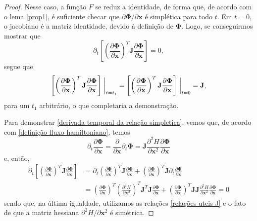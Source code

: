 \documentclass[
	12pt,
	oneside,			%
	a4paper,			%
	english,			%
	brazil				%
	]{abntex2}
\theoremstyle{definition}
\begin{document}
\begin{proof}
    Nesse caso, a função $F$ se reduz a identidade, de forma que, de acordo com o lema \ref{prop1}, é suficiente checar que $\partial \boldsymbol{\Phi}/ \partial \mathbf{x}$ é simplética para todo $t$. Em $t=0$, o jacobiano é a matriz identidade, devido à definição de $\boldsymbol{\Phi}$. Logo, se conseguirmos mostrar que
    \begin{equation}
    \label{derivada temporal da relação simpletica}
        \partial_t  \left[ \left( \frac{\partial\boldsymbol{\Phi}}{\partial \mathbf{x}} \right)^T \mathbf{J} \frac{\partial\boldsymbol{\Phi}}{\partial \mathbf{x}} \right] = 0,
    \end{equation}
    segue que
    \begin{equation}
        \left[ \left( \frac{\partial\boldsymbol{\Phi}}{\partial \mathbf{x}} \right)^T \mathbf{J} \frac{\partial\boldsymbol{\Phi}}{\partial \mathbf{x}} \right] \eval_{t=t_1} = \left[ \left( \frac{\partial\boldsymbol{\Phi}}{\partial \mathbf{x}} \right)^T \mathbf{J} \frac{\partial\boldsymbol{\Phi}}{\partial \mathbf{x}} \right] \eval_{t=0} = \mathbf{J},
    \end{equation}
    para um $t_1$ arbitrário, o que completaria a demonstração.
    
    Para demonstrar \eqref{derivada temporal da relação simpletica}, vemos que, de acordo com \eqref{definição fluxo hamiltoniano}, temos
    \begin{equation}
        \partial_t \frac{\partial\boldsymbol{\Phi}}{\partial \mathbf{x}} = \frac{\partial}{\partial \mathbf{x}} \partial_t\boldsymbol{\Phi} = \mathbf{J} \frac{\partial^2 H}{\partial \mathbf{x}^2} \frac{\partial\boldsymbol{\Phi}}{\partial \mathbf{x}}
    \end{equation}
    e, então,
    \begin{equation}
        \begin{aligned}
            \partial_t  \left[ \left( \frac{\partial\boldsymbol{\Phi}}{\partial \mathbf{x}} \right)^T \mathbf{J} \frac{\partial\boldsymbol{\Phi}}{\partial \mathbf{x}} \right] &=  \partial_t\left( \frac{\partial\boldsymbol{\Phi}}{\partial \mathbf{x}} \right)^T \mathbf{J} \frac{\partial\boldsymbol{\Phi}}{\partial \mathbf{x}} +  \left( \frac{\partial\boldsymbol{\Phi}}{\partial \mathbf{x}} \right)^T \mathbf{J} \partial_t\frac{\partial\boldsymbol{\Phi}}{\partial \mathbf{x}} \\ &= \left( \frac{\partial\boldsymbol{\Phi}}{\partial \mathbf{x}} \right)^T  \left( \frac{\partial^2 H}{\partial \mathbf{x}^2} \right)^T \mathbf{J}^T \mathbf{J} \frac{\partial\boldsymbol{\Phi}}{\partial \mathbf{x}} +  \left( \frac{\partial\boldsymbol{\Phi}}{\partial \mathbf{x}} \right)^T \mathbf{J} \mathbf{J} \frac{\partial^2 H}{\partial \mathbf{x}^2} \frac{\partial\boldsymbol{\Phi}}{\partial \mathbf{x}} = 0
        \end{aligned}
    \end{equation}
    sendo que, na última igualdade, utilizamos as relações \eqref{relações uteis J} e o fato de que a matriz hessiana $\partial^2 H/\partial \mathbf{x}^2$ é simétrica.
\end{proof}
\end{document}
